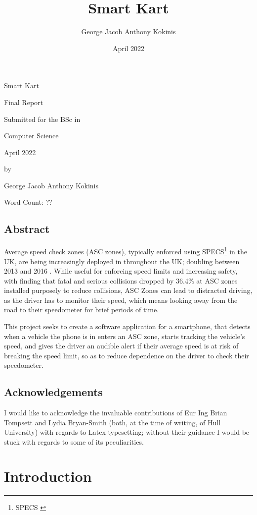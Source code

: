 \documentclass[11pt, a4paper, notitlepage]{report}
\title{Smart Kart}
\date{April 2022}
\author{George Jacob Anthony Kokinis}
\begin{document}
\begin{center}
	{\Huge Smart Kart}
	
	\bigskip
	{\Large Final Report}
	
	\bigskip
	Submitted for the BSc in
	
	\bigskip
	{\LARGE Computer Science}
	
	\bigskip
	April 2022
	
	\bigskip
	by 
	
	\bigskip
	{\LARGE George Jacob Anthony Kokinis}
    
    \bigskip
    Word Count: ?? %
\end{center}
\newpage
\section{Abstract}
Average speed check zones (ASC zones), typically enforced using SPECS\footnote{SPECS \citep{specsjenop}} in the UK, are being increasingly deployed in throughout the UK; doubling between 2013 and 2016 \citep{BBCSpeedCameraDoubled}. While useful for enforcing speed limits and increasing safety, with \citet{owenAllsop} finding that fatal and serious collisions dropped by 36.4\% at ASC zones installed purposely to reduce collisions, ASC Zones can lead to distracted driving, as the driver has to monitor their speed, which means looking away from the road to their speedometer for brief periods of time.

This project seeks to create a software application for a smartphone, that detects when a vehicle the phone is in enters an ASC zone, starts tracking the vehicle's speed, and gives the driver an audible alert if their average speed is at risk of breaking the speed limit, so as to reduce dependence on the driver to check their speedometer.

\section{Acknowledgements}
I would like to acknowledge the invaluable contributions of Eur Ing Brian Tompsett and Lydia Bryan-Smith (both, at the time of writing, of Hull University) with regards to Latex typesetting; without their guidance I would be stuck with regards to some of its peculiarities.

\tableofcontents

\chapter{Introduction}
\end{document}

